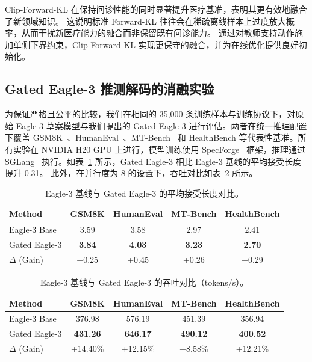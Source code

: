 Clip-Forward-KL 在保持问诊性能的同时显著提升医疗基准，表明其更有效地融合了新领域知识。
这说明标准 Forward-KL 往往会在稀疏离线样本上过度放大概率，从而干扰新医疗能力的融合而非保留既有问诊能力。
通过对教师支持动作施加单侧下界约束，Clip-Forward-KL 实现更保守的融合，并为在线优化提供良好初始化。

\subsection{Gated Eagle-3 推测解码的消融实验}

为保证严格且公平的比较，我们在相同的 35,000 条训练样本与训练协议下，对原始 Eagle-3 草案模型与我们提出的 Gated Eagle-3 进行评估。两者在统一推理配置下覆盖 GSM8K~\cite{DBLP:journals/corr/abs-2110-14168}、HumanEval~\cite{DBLP:journals/corr/abs-2107-03374}、MT-Bench~\cite{DBLP:conf/nips/ZhengC00WZL0LXZ23} 和 HealthBench 等代表性基准。所有实验在 NVIDIA H20 GPU 上进行，模型训练使用 SpecForge~\cite{specforge2025} 框架，推理通过 SGLang~\cite{zheng2024sglang} 执行。如表~\ref{tab:eagle_comparison} 所示，Gated Eagle-3 相比 Eagle-3 基线的平均接受长度提升 0.31。
此外，在并行度为 8 的设置下，吞吐对比如表~\ref{app:eagle_throughput_comparison} 所示。

\label{app:eagle_3}
\begin{table}[H]
\centering
\caption{Eagle-3 基线与 Gated Eagle-3 的平均接受长度对比。}
\label{tab:eagle_comparison}
\begin{tabular}{lcccc}
\toprule
Method & GSM8K & HumanEval & MT-Bench & HealthBench  \\
\midrule
Eagle-3 Base & 3.59 & 3.58 & 2.97 & 2.41 \\
Gated Eagle-3  & \textbf{3.84} & \textbf{4.03} & \textbf{3.23} & \textbf{2.70}  \\
\midrule
$\Delta$ (Gain) & +0.25 & +0.45 & +0.26 & +0.29  \\
\bottomrule
\end{tabular}
\end{table}

\begin{table}[H]
\centering
\caption{Eagle-3 基线与 Gated Eagle-3 的吞吐对比（tokens/s）。}
\label{app:eagle_throughput_comparison}
\begin{tabular}{lcccc}
\toprule
Method & GSM8K & HumanEval & MT-Bench & HealthBench  \\
\midrule
Eagle-3 Base & 376.98 & 576.19 & 451.39 & 356.94  \\
Gated Eagle-3 & \textbf{431.26} & \textbf{646.17} & \textbf{490.12} & \textbf{400.52}  \\
\midrule
$\Delta$ (Gain) & +14.40\% & +12.15\% & +8.58\% & +12.21\%  \\
\bottomrule
\end{tabular}
\end{table}

